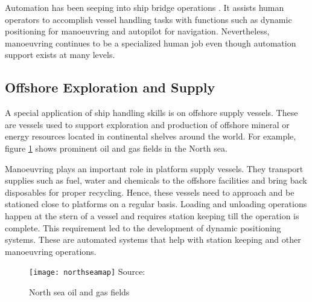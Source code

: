 Automation has been seeping into ship bridge operations \parencite{perunovic2011innovation}. It assists human operators to accomplish vessel handling tasks with functions such as dynamic positioning for manoeuvring and autopilot for navigation. Nevertheless, manoeuvring continues to be a specialized human job even though automation support exists at many levels.

\subsection{Offshore Exploration and Supply}
A special application of ship handling skills is on offshore supply vessels. These are vessels used to support exploration and production of offshore mineral or energy resources located in continental shelves around the world. For example, figure \ref{fig:northseamap} shows prominent oil and gas fields in the North sea. 

Manoeuvring plays an important role in platform supply vessels. They transport supplies such as fuel, water and chemicals to the offshore facilities and bring back disposables for proper recycling. Hence, these vessels need to approach and be stationed close to platforms on a regular basis. Loading and unloading operations happen at the stern of a vessel and requires station keeping till the operation is complete. This requirement led to the development of dynamic positioning systems. These are automated systems that help with station keeping and other manoeuvring operations. 
%

\begin{figure}
	\centering
	\caption{North sea oil and gas fields}
	\texttt{[image: northseamap]}
	\label{fig:northseamap}
	\hbox{\small Source: }
\end{figure}

